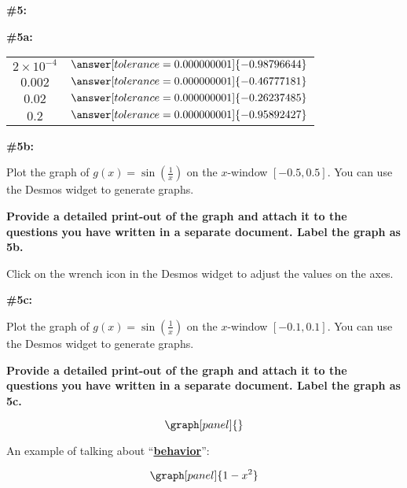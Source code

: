 \documentclass[handout,nooutcomes]{ximera}
\begin{document}
\begin{problem}{\textbf{\#5:}}
\begin{problem}{\textbf{\#5a:}}
\begin{tabular}{|c|c|}
		$2\times10^{-4}$ & $\answer[tolerance=0.000000001]{-0.98796644}$ \\
		
		$0.002$ & $\answer[tolerance=0.000000001]{-0.46777181}$ \\
		
		$0.02$ & $\answer[tolerance=0.000000001]{-0.26237485}$ \\
		
		$0.2$ & $\answer[tolerance=0.000000001]{-0.95892427}$ \\
		
\end{tabular}
\end{problem}



\begin{problem}{\textbf{\#5b:}}

Plot the graph of $g(x)=\sin\left(\frac{1}{x}\right)$ on the $x$-window $[-0.5,0.5]$. You can use the Desmos widget to generate graphs. 

\textbf{Provide a detailed print-out of the graph and attach it to the questions you have written in a separate document. Label the graph as 5b.}

\begin{hint}
Click on the wrench icon in the Desmos widget to adjust the values on the axes.
\end{hint}


\end{problem}

\begin{problem}{\textbf{\#5c:}}

Plot the graph of $g(x)=\sin\left(\frac{1}{x}\right)$ on the $x$-window $[-0.1,0.1]$. You can use the Desmos widget to generate graphs. 

\textbf{Provide a detailed print-out of the graph and attach it to the questions you have written in a separate document. Label the graph as 5c.}

\end{problem}

\[
\graph[panel]{}
\]

\end{problem}


\underline{\hspace{5in}}

An example of talking about ``\textbf{\underline{behavior}}'':

\[
\graph[panel]{1-x^2}
\]
\end{document}

